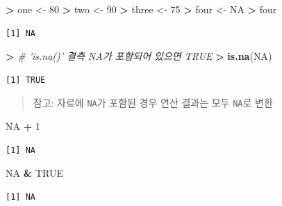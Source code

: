 \documentclass[11pt,a4paper]{book}
\newenvironment{Shaded}{\begin{snugshade}}{\end{snugshade}}
\newcommand{\KeywordTok}[1]{\textcolor[rgb]{0.13,0.29,0.53}{\textbf{#1}}}
\newcommand{\DecValTok}[1]{\textcolor[rgb]{0.00,0.00,0.81}{#1}}
\newcommand{\StringTok}[1]{\textcolor[rgb]{0.31,0.60,0.02}{#1}}
\newcommand{\CommentTok}[1]{\textcolor[rgb]{0.56,0.35,0.01}{\textit{#1}}}
\newcommand{\OtherTok}[1]{\textcolor[rgb]{0.56,0.35,0.01}{#1}}
\newcommand{\OperatorTok}[1]{\textcolor[rgb]{0.81,0.36,0.00}{\textbf{#1}}}
\newcommand{\ErrorTok}[1]{\textcolor[rgb]{0.64,0.00,0.00}{\textbf{#1}}}
\newcommand{\NormalTok}[1]{#1}
\theoremstyle{definition}
\theoremstyle{definition}
\theoremstyle{definition}
\theoremstyle{remark}
\begin{document}
\footnotesize

\begin{Shaded}
\begin{Highlighting}[]
\OperatorTok{>}\StringTok{ }\NormalTok{one <-}\StringTok{ }\DecValTok{80}
\OperatorTok{>}\StringTok{ }\NormalTok{two <-}\StringTok{ }\DecValTok{90}
\OperatorTok{>}\StringTok{ }\NormalTok{three <-}\StringTok{ }\DecValTok{75}
\OperatorTok{>}\StringTok{ }\NormalTok{four <-}\StringTok{ }\OtherTok{NA}
\OperatorTok{>}\StringTok{ }\NormalTok{four}
\end{Highlighting}
\end{Shaded}

\begin{verbatim}
[1] NA
\end{verbatim}

\begin{Shaded}
\begin{Highlighting}[]
\OperatorTok{>}\StringTok{ }\CommentTok{# 'is.na()' 결측 NA가 포함되어 있으면 TRUE}
\ErrorTok{>}\StringTok{ }\KeywordTok{is.na}\NormalTok{(}\OtherTok{NA}\NormalTok{)}
\end{Highlighting}
\end{Shaded}

\begin{verbatim}
[1] TRUE
\end{verbatim}

\normalsize

\begin{quote}
참고: 자료에 \texttt{NA}가 포함된 경우 연산 결과는 모두 \texttt{NA}로
변환
\end{quote}

\footnotesize

\begin{Shaded}
\begin{Highlighting}[]
\OtherTok{NA} \OperatorTok{+}\StringTok{ }\DecValTok{1}
\end{Highlighting}
\end{Shaded}

\begin{verbatim}
[1] NA
\end{verbatim}

\begin{Shaded}
\begin{Highlighting}[]
\OtherTok{NA} \OperatorTok{&}\StringTok{ }\OtherTok{TRUE}
\end{Highlighting}
\end{Shaded}

\begin{verbatim}
[1] NA
\end{verbatim}
\end{document}
